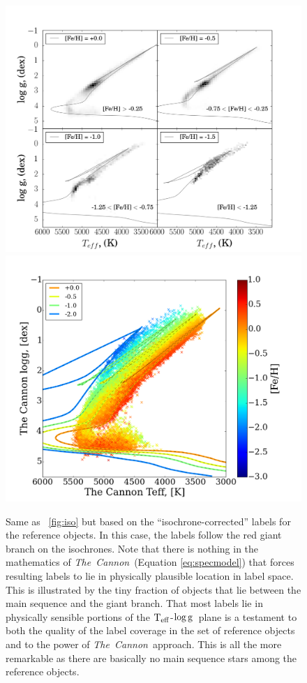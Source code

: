 \documentclass[12pt, preprint]{aastex}
\newcommand{\tc}{\textsl{The~Cannon}}
\newcommand{\teff}{\mbox{$\rm T_{eff}$}}
\newcommand{\logg}{\mbox{$\rm \log g$}}
\begin{document}
\begin{figure}[!h]
\centering
 \includegraphics[scale=0.25]{./plots/iso2_2.png}
  \hspace{-20pt}
    \includegraphics[scale=0.25]{./plots/iso2a_2.png}
\caption{Same as \figurename~\ref{fig:iso} but based on the ``isochrone-corrected'' labels for the reference objects. In this case, the labels follow the red giant branch on the isochrones. Note that there is nothing in the mathematics of \tc\ (Equation \ref{eq:specmodel}) that forces resulting labels to lie in physically plausible location in label space. This is illustrated by the tiny fraction of objects that lie between the main sequence and the giant branch. That most labels lie in physically sensible portions of the \teff-\logg\ plane is a testament to both the quality of the label coverage in the set of reference objects and to the power of \tc\ approach. This is all the more remarkable as there are basically no main sequence stars among the reference objects.}
\label{fig:iso2}
\end{figure}
\end{document}
